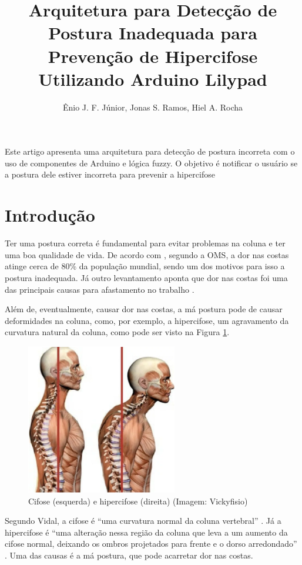 \documentclass[12pt]{article}
\title{Arquitetura para Detecção de Postura Inadequada para Prevenção de Hipercifose Utilizando Arduino Lilypad}
\author{Ênio J. F. Júnior\inst{1}, Jonas S. Ramos\inst{1}, Hiel A. Rocha\inst{1} }
\begin{document}
 

\maketitle
     
\begin{resumo} 
  Este artigo apresenta uma arquitetura para detecção de postura incorreta com o uso de componentes de Arduino e lógica fuzzy. O objetivo é notificar o usuário se a postura dele estiver incorreta para prevenir a hipercifose
\end{resumo}

\section{Introdução}

Ter uma postura correta é fundamental para evitar problemas na coluna e ter uma boa qualidade de vida. De acordo com \cite{cru:17}, segundo a OMS, a dor nas costas atinge cerca de 80\% da população mundial, sendo um dos motivos para isso a postura inadequada. Já outro levantamento aponta que dor nas costas foi uma das principais causas para afastamento no trabalho \cite{ig:17}.  

Além de, eventualmente, causar dor nas costas, a má postura pode de causar deformidades na coluna, como, por exemplo, a hipercifose, um agravamento da curvatura natural da coluna, como pode ser visto na Figura \ref{fig:example4}. 

\begin{figure}[ht]
\centering
\includegraphics{fig4.png}
\caption{Cifose (esquerda) e hipercifose (direita) (Imagem: Vickyfisio)}
\label{fig:example4}
\end{figure}

Segundo Vidal, a cifose é “uma curvatura normal da coluna vertebral” \cite{vidal:17}. Já a hipercifose é “uma alteração nessa região da coluna que leva a um aumento da cifose normal, deixando os ombros projetados para frente e o dorso arredondado” \cite{vidal:17}. Uma das causas é a má postura, que pode acarretar dor nas costas.
\end{document}
